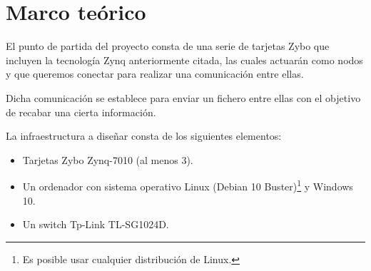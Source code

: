 \section{Marco teórico}
El punto de partida del proyecto consta de una serie de tarjetas Zybo que incluyen la tecnología Zynq anteriormente citada, las cuales actuarán como nodos y que queremos conectar para realizar una comunicación entre ellas.

Dicha comunicación se establece para enviar un fichero entre ellas con el objetivo de recabar una cierta información.

La infraestructura a diseñar consta de los siguientes elementos:
\begin{itemize}
	\item Tarjetas Zybo Zynq-7010 (al menos 3).
	\item Un ordenador con sistema operativo Linux (Debian 10 Buster)\footnote{Es posible usar cualquier distribución de Linux.} y Windows 10.
	\item Un switch Tp-Link TL-SG1024D.
\end{itemize}